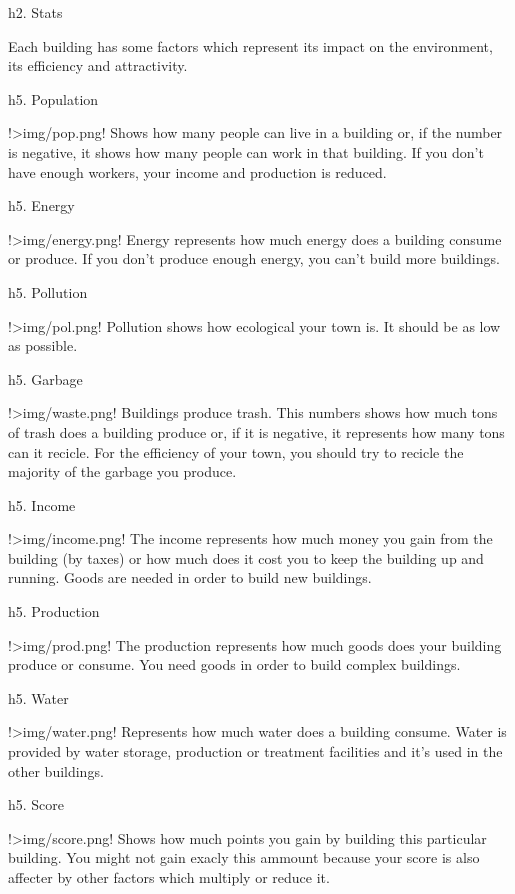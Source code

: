 h2. Stats

Each building has some factors which represent its impact on the environment, its efficiency and attractivity.

h5. Population

!>img/pop.png! Shows how many people can live in a building or, if the number is negative, it shows how many people can work in that building. If you don't have enough workers, your income and production is reduced.

h5. Energy

!>img/energy.png! Energy represents how much energy does a building consume or produce. If you don't produce enough energy, you can't build more buildings.

h5. Pollution

!>img/pol.png! Pollution shows how ecological your town is. It should be as low as possible.

h5. Garbage

!>img/waste.png! Buildings produce trash. This numbers shows how much tons of trash does a building produce or, if it is negative, it represents how many tons can it recicle. For the efficiency of your town, you should try to recicle the majority of the garbage you produce.

h5. Income

!>img/income.png! The income represents how much money you gain from the building (by taxes) or how much does it cost you to keep the building up and running. Goods are needed in order to build new buildings.

h5. Production

!>img/prod.png! The production represents how much goods does your building produce or consume. You need goods in order to build complex buildings.

h5. Water

!>img/water.png! Represents how much water does a building consume. Water is provided by water storage, production or treatment facilities and it's used in the other buildings.

h5. Score

!>img/score.png! Shows how much points you gain by building this particular building. You might not gain exacly this ammount because your score is also affecter by other factors which multiply or reduce it.